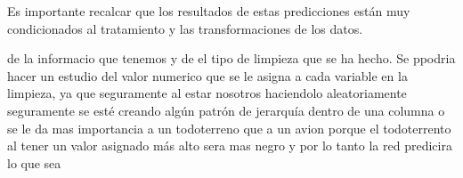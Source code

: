 Es importante recalcar que los resultados de estas predicciones están muy condicionados al tratamiento y las transformaciones de los datos.




 de la informacio que tenemos y de el tipo de limpieza que se ha hecho. Se ppodria hacer un estudio del valor numerico que se le asigna a cada variable en la limpieza, ya que seguramente al estar nosotros haciendolo aleatoriamente seguramente se esté creando algún patrón de jerarquía dentro de una columna o se le da mas importancia a un todoterreno que a un avion porque el todoterrento al tener un valor asignado más alto sera mas negro y por lo tanto la red predicira lo que sea



